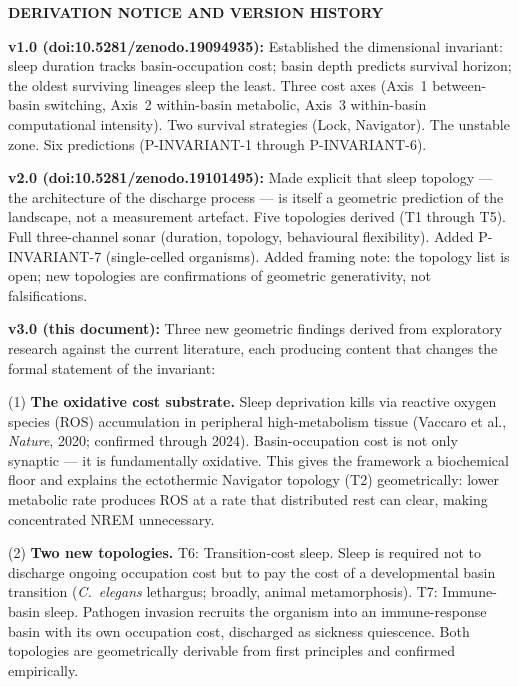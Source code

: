 \documentclass[10pt, a4paper]{article}
\begin{document}
\vspace{0.5em}

\begin{mdframed}[
  backgroundcolor=derivbox,
  linecolor=headergreen,
  linewidth=0.8pt,
  innertopmargin=0.6em,
  innerbottommargin=0.6em,
  innerleftmargin=0.8em,
  innerrightmargin=0.8em
]
\textbf{DERIVATION NOTICE AND VERSION
HISTORY}

\smallskip
\textbf{v1.0 (doi:10.5281/zenodo.19094935):}
Established the dimensional invariant:
sleep duration tracks basin-occupation cost;
basin depth predicts survival horizon;
the oldest surviving lineages sleep the
least. Three cost axes (Axis~1
between-basin switching, Axis~2 within-basin
metabolic, Axis~3 within-basin computational
intensity). Two survival strategies (Lock,
Navigator). The unstable zone. Six
predictions (P-INVARIANT-1 through
P-INVARIANT-6).

\smallskip
\textbf{v2.0
(doi:10.5281/zenodo.19101495):}
Made explicit that sleep topology ---
the architecture of the discharge process
--- is itself a geometric prediction of
the landscape, not a measurement artefact.
Five topologies derived (T1 through T5).
Full three-channel sonar (duration,
topology, behavioural flexibility).
Added P-INVARIANT-7 (single-celled
organisms). Added framing note:
the topology list is open; new topologies
are confirmations of geometric generativity,
not falsifications.

\smallskip
\textbf{v3.0 (this document):}
Three new geometric findings derived from
exploratory research against the current
literature, each producing content that
changes the formal statement of the
invariant:

\smallskip
(1) \textbf{The oxidative cost substrate.}
Sleep deprivation kills via reactive oxygen
species (ROS) accumulation in peripheral
high-metabolism tissue (Vaccaro et al.,
\textit{Nature}, 2020; confirmed through
2024). Basin-occupation cost is not only
synaptic --- it is fundamentally oxidative.
This gives the framework a biochemical
floor and explains the ectothermic Navigator
topology (T2) geometrically: lower
metabolic rate produces ROS at a rate
that distributed rest can clear, making
concentrated NREM unnecessary.

\smallskip
(2) \textbf{Two new topologies.}
T6: Transition-cost sleep. Sleep is
required not to discharge ongoing
occupation cost but to pay the cost of
a developmental basin transition
(\textit{C.~elegans} lethargus; broadly,
animal metamorphosis). T7: Immune-basin
sleep. Pathogen invasion recruits the
organism into an immune-response basin
with its own occupation cost, discharged
as sickness quiescence. Both topologies
are geometrically derivable from first
principles and confirmed empirically.


\end{mdframed}
\end{document}
